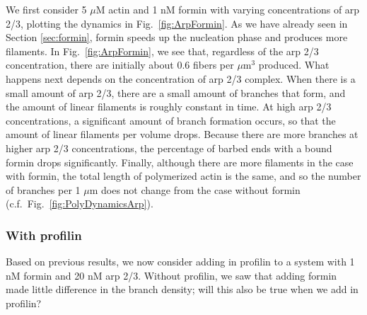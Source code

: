 \documentclass[11pt]{article}
\begin{document}
We first consider 5 $\mu$M actin and 1 nM formin with varying concentrations of arp 2/3, plotting the dynamics in Fig.\ \ref{fig:ArpFormin}. As we have already seen in Section \ref{sec:formin}, formin speeds up the nucleation phase and produces more filaments. In Fig.\ \ref{fig:ArpFormin}, we see that, regardless of the arp 2/3 concentration, there are initially about 0.6 fibers per $\mu$m$^3$ produced. What happens next depends on the concentration of arp 2/3 complex. When there is a small amount of arp 2/3, there are a small amount of branches that form, and the amount of linear filaments is roughly constant in time. At high arp 2/3 concentrations, a significant amount of branch formation occurs, so that the amount of linear filaments per volume drops. Because there are more branches at higher arp 2/3 concentrations, the percentage of barbed ends with a bound formin drops significantly. Finally, although there are more filaments in the case with formin, the total length of polymerized actin is the same, and so the number of branches per 1 $\mu$m does not change from the case without formin (c.f.\ Fig.\ \ref{fig:PolyDynamicsArp}). 


\iffalse
\begin{figure}
\centering
\texttt{[image: FibLengthsArpFormin.eps]}
\texttt{[image: BranchLengthsArpFormin.eps]}
\caption{\label{fig:LengthDistsArpFormin} The length distribution of filaments with 5 $\mu$M actin concentration, 1 nM formin, and various concentrations of arp 2/3 (2 nM at left, 20 nM in the middle, and 200 nM at right). We separate the filaments into linear and mother filaments, and show their length distribution at the top, and branches, with their length distribution at the bottom. }
\end{figure}

The length distributions in Fig.\ \ref{fig:LengthDistsArpFormin} show how the concentration of arp 2/3 sets the length of the filaments over time. At arp concentrations in the range 2--20 nM, there is initially build-up of actin into fibers with about 4000 monomers. Most of these fibers then shrink over time as monomers get taken away to form new branches, most of which are small in size. This effect is strongest at 200 nM arp 2/3, when the fibers do not build up to be as large initially (branching and nucleation happen at the same time), and most of the fibers rapidly shrink down, giving way to more branching.
\fi

\subsubsection{With profilin}
Based on previous results, we now consider adding in profilin to a system with 1 nM formin and 20 nM arp 2/3. Without profilin, we saw that adding formin made little difference in the branch density; will this also be true when we add in profilin?
\end{document}
